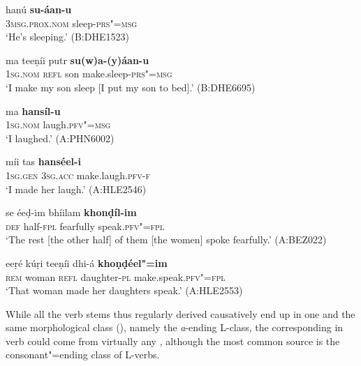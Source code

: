 \begin{exe}
\ex
\label{ex:8-7}
\gll hanú \textbf{su-áan-u} \\
\textsc{3msg.prox.nom} sleep-\textsc{prs"=msg} \\
\glt `He's sleeping.' (B:DHE1523)
\end{exe}
\begin{exe}
\ex
\label{ex:8-8}
\gll ma teeṇíi putr \textbf{su(w)a-(y)áan-u}  \\
\textsc{1sg.nom} \textsc{refl} son make.sleep-\textsc{prs"=msg} \\
\glt `I make my son sleep [I put my son to bed].' (B:DHE6695)
\end{exe}
\begin{exe}
\ex
\label{ex:8-9}
\gll ma \textbf{hansíl-u} \\
\textsc{1sg.nom} laugh.\textsc{pfv"=msg} \\
\glt `I laughed.' (A:PHN6002)
\end{exe}
\begin{exe}
\ex
\label{ex:8-10}
\gll míi tas \textbf{hanséel-i} \\
\textsc{1sg.gen} \textsc{3sg.acc} make.laugh.\textsc{pfv-f} \\
\glt `I made her laugh.' (A:HLE2546)
\end{exe}
\begin{exe}
\ex
\label{ex:8-11}
\gll se éeḍ-im bhíilam \textbf{khonḍíl-im} \\
\textsc{def} half-\textsc{fpl} fearfully speak.\textsc{pfv"=fpl} \\
\glt `The rest [the other half] of them [the women] spoke fearfully.' (A:BEZ022)
\end{exe}
\begin{exe}
\ex
\label{ex:8-12}
\gll eeṛé kúṛi teeṇíi dhi-á \textbf{khoṇḍéel"=im} \\
\textsc{rem} woman \textsc{refl} daughter-\textsc{pl} make.speak.\textsc{pfv"=fpl} \\
\glt `That woman made her daughters speak.' (A:HLE2553)
\end{exe}

While all the verb stems thus regularly derived causatively end up in one and the same morphological class (), namely the \textit{a}-ending L-class, the corresponding in verb could come from virtually any , although the most common source is the consonant"=ending class of L-verbs.


